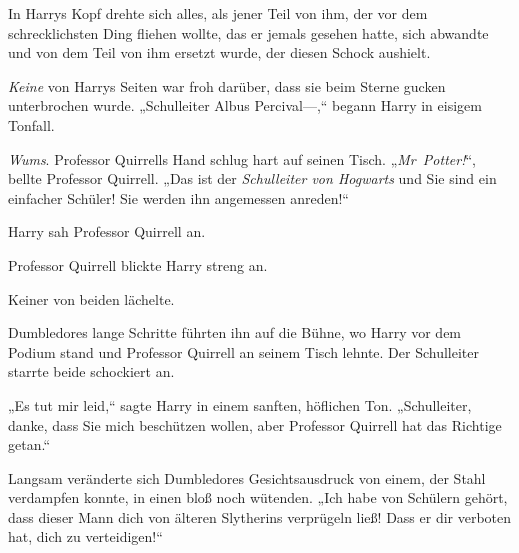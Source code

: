 In Harrys Kopf drehte sich alles, als jener Teil von ihm, der vor dem schrecklichsten Ding fliehen wollte, das er jemals gesehen hatte, sich abwandte und von dem Teil von ihm ersetzt wurde, der diesen Schock aushielt.

\emph{Keine} von Harrys Seiten war froh darüber, dass sie beim Sterne gucken unterbrochen wurde. „Schulleiter Albus Percival—,“ begann Harry in eisigem Tonfall.

\emph{Wums}. Professor Quirrells Hand schlug hart auf seinen Tisch. „\emph{Mr~Potter!}“, bellte Professor Quirrell. „Das ist der \emph{Schulleiter von Hogwarts} und Sie sind ein einfacher Schüler! Sie werden ihn angemessen anreden!“

Harry sah Professor Quirrell an.

Professor Quirrell blickte Harry streng an.

Keiner von beiden lächelte.

Dumbledores lange Schritte führten ihn auf die Bühne, wo Harry vor dem Podium stand und Professor Quirrell an seinem Tisch lehnte. Der Schulleiter starrte beide schockiert an.

„Es tut mir leid,“ sagte Harry in einem sanften, höflichen Ton. „Schulleiter, danke, dass Sie mich beschützen wollen, aber Professor Quirrell hat das Richtige getan.“

Langsam veränderte sich Dumbledores Gesichtsausdruck von einem, der Stahl verdampfen konnte, in einen bloß noch wütenden. „Ich habe von Schülern gehört, dass dieser Mann dich von älteren Slytherins verprügeln ließ! Dass er dir verboten hat, dich zu verteidigen!“

